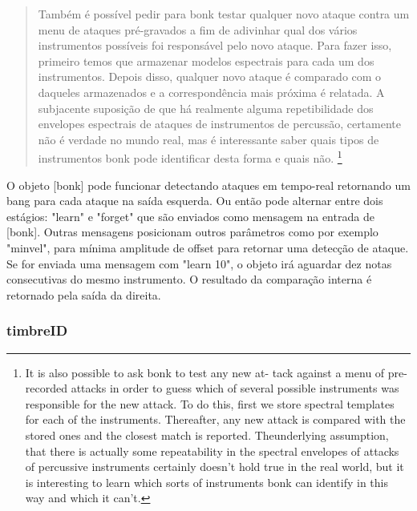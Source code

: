 \documentclass[draft]{ppgmus}
\begin{document}
\begin{quote}
Também é possível pedir para bonk testar qualquer novo ataque 
contra um menu de ataques pré-gravados a fim
de adivinhar qual dos vários instrumentos possíveis foi
responsável pelo novo ataque. Para fazer isso, primeiro temos
que armazenar modelos espectrais para cada um dos instrumentos.
Depois disso, qualquer novo ataque é comparado com o
daqueles armazenados e a correspondência mais próxima é relatada. 
A subjacente suposição de que há realmente alguma
repetibilidade dos envelopes espectrais de ataques de
instrumentos de percussão, certamente não é verdade no mundo real, mas é interessante saber quais
tipos de instrumentos bonk pode identificar desta forma
e quais não. \footnote{It is also possible to ask bonk to test any new at-
tack against a menu of pre-recorded attacks in order
to guess which of several possible instruments was
responsible for the new attack. To do this, first we
store spectral templates for each of the instruments.
Thereafter, any new attack is compared with the
stored ones and the closest match is reported. 
Theunderlying assumption, that there is actually some
repeatability in the spectral envelopes of attacks of
percussive instruments certainly doesn't hold true in
the real world, but it is interesting to learn which
sorts of instruments bonk can identify in this way
and which it can't.} \cite{bonk}
\end{quote}

O objeto [bonk\texttildelow] pode funcionar detectando
ataques em tempo-real retornando um bang para cada ataque 
na saída esquerda. Ou então pode alternar entre dois estágios:
"learn" e "forget" que são enviados como mensagem na entrada de 
[bonk\texttildelow]. Outras mensagens posicionam outros
parâmetros como por exemplo "minvel", para mínima amplitude de offset
para retornar uma detecção de ataque.
Se for enviada uma mensagem com "learn 10",
o objeto irá aguardar dez notas consecutivas do mesmo instrumento.
O resultado da comparação interna é retornado pela saída da direita.



\subsubsection{timbreID}
\end{document}
